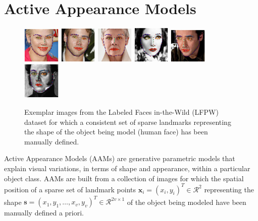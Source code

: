 \section{Active Appearance Models}
\label{sec:aam}

\begin{figure}
	\centering
	\includegraphics[width=0.16\textwidth]{figures/img0.png}
	\includegraphics[width=0.16\textwidth]{figures/img1.png}
	\includegraphics[width=0.16\textwidth]{figures/img2.png}
	\includegraphics[width=0.16\textwidth]{figures/img3.png}
	\includegraphics[width=0.16\textwidth]{figures/img4.png}
	\includegraphics[width=0.16\textwidth]{figures/img5.png}
	\caption{Exemplar images from the Labeled Faces in-the-Wild (LFPW) dataset \cite{Belhumeur2011} for which a consistent set of sparse landmarks representing the shape of the object being model (human face) has been manually defined.}
	\label{fig:lfpw_images}
\end{figure}

Active Appearance Models (AAMs) \cite{Cootes2001,Matthews2004} are generative parametric models that explain visual variations, in terms of shape and appearance, within a particular object class. AAMs are built from a collection of images for which the spatial position of a sparse set of landmark points $\mathbf{x}_i = (x_i, y_i)^T \in \mathcal{R}^2$ representing the shape $\mathbf{s} = (x_1, y_1, \dots, x_v, y_v)^T \in \mathcal{R}^{2v \times 1}$ of the object being modeled have been manually defined a priori. 

